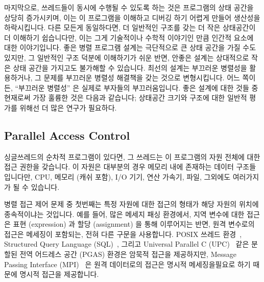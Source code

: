 마지막으로, 쓰레드들이 동시에 수행될 수 있도록 하는 것은 프로그램의 상태 공간을
상당히 증가시키며, 이는 이 프로그램을 이해하고 디버깅 하기 어렵게 만들어
생산성을 하락시킵니다.
다른 모든게 동일하다면, 더 일반적인 구조를 갖는 더 작은 상태공간이 더 이해하기
쉽습니다만, 이는 그게 기술적이나 수학적 이야기인 만큼 인간적 요소에 대한
이야기입니다.
좋은 병렬 프로그램 설계는 극단적으로 큰 상태 공간을 가질 수도 있지만, 그
일반적인 구조 덕분에 이해하기가 쉬운 반면, 안좋은 설계는 상대적으로 작은 상태
공간을 가지고도 불가해할 수 있습니다.
최선의 설계는 부끄러운 병렬성을 활용하거나, 그 문제를 부끄러운 병렬성 해결책을
갖는 것으로 변형시킵니다.
어느 쪽이든, ``부끄러운 병렬성'' 은 실제로 부자들의 부끄러움입니다.
좋은 설계에 대한 것들 중 현재로써 가장 훌륭한 것은 다음과 같습니다; 상태공간
크기와 구조에 대한 일반적 평가를 위해선 더 많은 연구가 필요하다.

\subsection{Parallel Access Control}
\label{sec:Parallel Access Control}

싱글쓰레드의 순차적 프로그램이 있다면, 그 쓰레드는 이 프로그램의 자원 전체에
대한 접근 권한을 갖습니다.
이 자원은 대부분의 경우 메모리 내에 존재하는 데이터 구조들입니다만, CPU, 메모리
(캐쉬 포함), I/O 기기, 연산 가속기, 파일, 그외에도 여러가지가 될 수 있습니다.

병렬 접근 제어 문제 중 첫번째는 특정 자원에 대한 접근의 형태가 해당 자원의
위치에 종속적이냐는 것입니다.
예를 들어, 많은 메세지 패싱 환경에서, 지역 변수에 대한 접근은 표현 (expression)
과 할당 (assignment) 을 통해 이루어지는 반면, 원격 변수로의 접근은 메세징이
포함되는, 전혀 다른 구문을 사용합니다.
POSIX 쓰레드 환경~\cite{OpenGroup1997pthreads}, Structured Query Language
(SQL)~\cite{DIS9075SQL92}, 그리고 Universal Parallel C
(UPC)~\cite{ElGhazawi2003UPC,UPCConsortium2013} 같은 분할된 전역 어드레스 공간
(PGAS) 환경은 암묵적 접근을 제공하지만, Message Passing Interface
(MPI)~\cite{MPIForum2008} 은 원격 데이터로의 접근은 명시적 메세징을필요로 하기
때문에 명시적 접근을 제공합니다.


